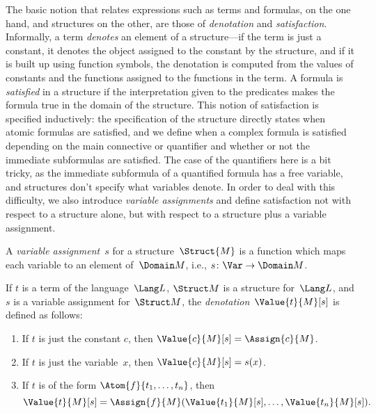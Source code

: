 \documentclass[../../include/open-logic-section]{subfiles}
\begin{document}

\begin{explain}
The basic notion that relates expressions such as terms and formulas,
on the one hand, and structures on the other, are those of
\emph{denotation} and \emph{satisfaction}.  Informally, a term
\emph{denotes} an element of a structure---if the term is just a
constant, it denotes the object assigned to the constant by the
structure, and if it is built up using function symbols, the
denotation is computed from the values of constants and the functions
assigned to the functions in the term.  A formula is \emph{satisfied}
in a structure if the interpretation given to the predicates makes the
formula true in the domain of the structure. This notion of
satisfaction is specified inductively: the specification of the
structure directly states when atomic formulas are satisfied, and we
define when a complex formula is satisfied depending on the main
connective or quantifier and whether or not the immediate subformulas
are satisfied. The case of the quantifiers here is a bit tricky, as
the immediate subformula of a quantified formula has a free variable,
and structures don't specify what variables denote.  In order to deal
with this difficulty, we also introduce \emph{variable assignments}
and define satisfaction not with respect to a structure alone, but
with respect to a structure plus a variable assignment.
\end{explain}

\begin{defn}
A \emph{variable assignment}~$s$ for a structure~$\Struct{M}$ is a
function which maps each variable to an element of~$\Domain M$, i.e.,
$s\colon \Var \to \Domain M$.
\end{defn}

\begin{defn}
If $t$ is a term of the language~$\Lang L$, $\Struct M$ is a structure
for~$\Lang L$, and $s$ is a variable assignment for~$\Struct M$, the
\emph{denotation}~$\Value{t}{M}[s]$ is defined as follows:
\begin{enumerate}
\item If $t$ is just the constant $c$, then $\Value{c}{M}[s] = \Assign{c}{M}$.
\item If $t$ is just the variable~$x$, then $\Value{c}{M}[s] = s(x)$.
\item If $t$ is of the form $\Atom{f}{t_1, \ldots, t_n}$, then
\[
\Value{t}{M}[s] = \Assign{f}{M}(\Value{t_1}{M}[s], \ldots,
\Value{t_n}{M}[s]).
\]
\end{enumerate}
\end{defn}
\end{document}
